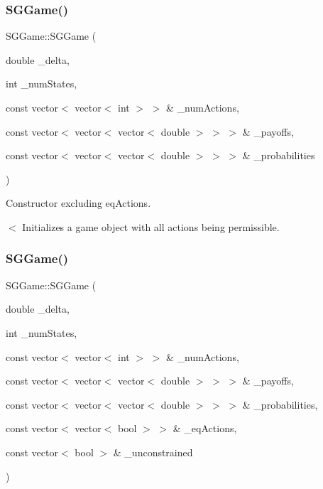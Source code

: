 \subsubsection{\texorpdfstring{S\+G\+Game()}{SGGame()}\hspace{0.1cm}{\footnotesize\ttfamily [2/4]}}
{\footnotesize\ttfamily S\+G\+Game\+::\+S\+G\+Game (\begin{DoxyParamCaption}\item[{double}]{\+\_\+delta,  }\item[{int}]{\+\_\+num\+States,  }\item[{const vector$<$ vector$<$ int $>$ $>$ \&}]{\+\_\+num\+Actions,  }\item[{const vector$<$ vector$<$ vector$<$ double $>$ $>$ $>$ \&}]{\+\_\+payoffs,  }\item[{const vector$<$ vector$<$ vector$<$ double $>$ $>$ $>$ \&}]{\+\_\+probabilities }\end{DoxyParamCaption})}



Constructor excluding eq\+Actions. 

$<$ Initializes a game object with all actions being permissible. \mbox{\label{classSGGame_abf23f0bd27cc79e44bdae273ef8a7735}} 
\subsubsection{\texorpdfstring{S\+G\+Game()}{SGGame()}\hspace{0.1cm}{\footnotesize\ttfamily [3/4]}}
{\footnotesize\ttfamily S\+G\+Game\+::\+S\+G\+Game (\begin{DoxyParamCaption}\item[{double}]{\+\_\+delta,  }\item[{int}]{\+\_\+num\+States,  }\item[{const vector$<$ vector$<$ int $>$ $>$ \&}]{\+\_\+num\+Actions,  }\item[{const vector$<$ vector$<$ vector$<$ double $>$ $>$ $>$ \&}]{\+\_\+payoffs,  }\item[{const vector$<$ vector$<$ vector$<$ double $>$ $>$ $>$ \&}]{\+\_\+probabilities,  }\item[{const vector$<$ vector$<$ bool $>$ $>$ \&}]{\+\_\+eq\+Actions,  }\item[{const vector$<$ bool $>$ \&}]{\+\_\+unconstrained }\end{DoxyParamCaption})}



